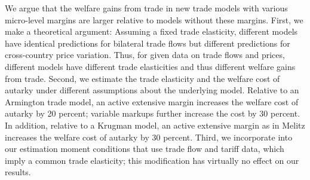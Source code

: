 \documentclass[12pt,dvips, ps2pdf]{article}
\begin{document}
We argue that the welfare gains from trade in new trade models with various micro-level margins are larger relative to models without these margins. First, we make a theoretical argument: Assuming a fixed trade elasticity, different models have identical predictions for bilateral trade flows but different predictions for cross-country price variation. Thus, for given data on trade flows and prices, different models have different trade elasticities and thus different welfare gains from trade. Second, we estimate the trade elasticity and the welfare cost of autarky under different assumptions about the underlying model. Relative to an Armington trade model, an active extensive margin increases the welfare cost of autarky by 20 percent; variable markups further increase the cost by 30 percent. In addition, relative to a Krugman model, an active extensive margin as in Melitz increases the welfare cost of autarky by 30 percent. Third, we incorporate into our estimation moment conditions that use trade flow and tariff data, which imply a common trade elasticity; this modification has virtually no effect on our results.






\bigskip

\bigskip
\end{document}

